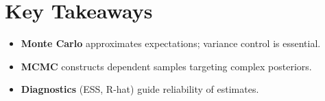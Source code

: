 
\section*{Key Takeaways}

\begin{itemize}[leftmargin=2em]
    \item \textbf{Monte Carlo} approximates expectations; variance control is essential.
    \item \textbf{MCMC} constructs dependent samples targeting complex posteriors.
    \item \textbf{Diagnostics} (ESS, R-hat) guide reliability of estimates.
\end{itemize}


